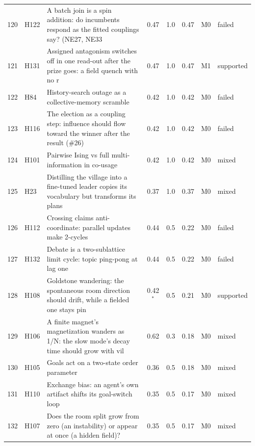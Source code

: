 \begin{table}[p]
\begin{tabular}{@{}r l p{} c c c c l@{}}
120 & H122 & A batch join is a spin addition: do incumbents respond as the fitted couplings say? (NE27, NE33 & 0.47 & 1.0 & 0.47 & M0 & failed\\
121 & H131 & Assigned antagonism switches off in one read-out after the prize goes: a field quench with no r & 0.47 & 1.0 & 0.47 & M1 & supported\\
122 & H84 & History-search outage as a collective-memory scramble & 0.42 & 1.0 & 0.42 & M0 & failed\\
123 & H116 & The election as a coupling step: influence should flow toward the winner after the result (\#26) & 0.42 & 1.0 & 0.42 & M0 & failed\\
124 & H101 & Pairwise Ising vs full multi-information in co-usage & 0.42 & 1.0 & 0.42 & M0 & mixed\\
125 & H23 & Distilling the village into a fine-tuned leader copies its vocabulary but transforms its plans & 0.37 & 1.0 & 0.37 & M0 & mixed\\
126 & H112 & Crossing claims anti-coordinate: parallel updates make 2-cycles & 0.44 & 0.5 & 0.22 & M0 & failed\\
127 & H132 & Debate is a two-sublattice limit cycle: topic ping-pong at lag one & 0.44 & 0.5 & 0.22 & M0 & failed\\
128 & H108 & Goldstone wandering: the spontaneous room direction should drift, while a fielded one stays pin & 0.42$^\ast$ & 0.5 & 0.21 & M0 & supported\\
129 & H106 & A finite magnet's magnetization wanders as 1/N: the slow mode's decay time should grow with vil & 0.62 & 0.3 & 0.18 & M0 & mixed\\
130 & H105 & Goals act on a two-state order parameter & 0.36 & 0.5 & 0.18 & M0 & mixed\\
131 & H110 & Exchange bias: an agent's own artifact shifts its goal-switch loop & 0.35 & 0.5 & 0.17 & M0 & mixed\\
132 & H107 & Does the room split grow from zero (an instability) or appear at once (a hidden field)? & 0.35 & 0.5 & 0.17 & M0 & mixed\\
\bottomrule
\end{tabular}
\end{table}
